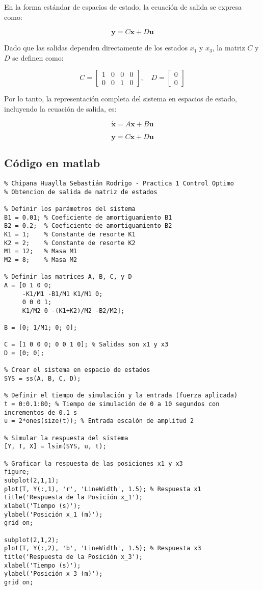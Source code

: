 \documentclass{report}
\begin{document}
En la forma estándar de espacios de estado, la ecuación de salida se expresa como:

\[
\mathbf{y} = C\mathbf{x} + D\mathbf{u}
\]

Dado que las salidas dependen directamente de los estados \(x_1\) y \(x_3\), la matriz \(C\) y \(D\) se definen como:

\[
C = \begin{bmatrix} 1 & 0 & 0 & 0 \\ 0 & 0 & 1 & 0 \end{bmatrix}, \quad D = \begin{bmatrix} 0 \\ 0 \end{bmatrix}
\]


Por lo tanto, la representación completa del sistema en espacios de estado, incluyendo la ecuación de salida, es:

\[
\dot{\mathbf{x}} = A\mathbf{x} + B\mathbf{u}
\]

\[
\mathbf{y} = C\mathbf{x} + D\mathbf{u}
\]

\subsection{Código en matlab}
\begin{verbatim}
% Chipana Huaylla Sebastián Rodrigo - Practica 1 Control Optimo
% Obtencion de salida de matriz de estados

% Definir los parámetros del sistema
B1 = 0.01; % Coeficiente de amortiguamiento B1
B2 = 0.2;  % Coeficiente de amortiguamiento B2
K1 = 1;    % Constante de resorte K1
K2 = 2;    % Constante de resorte K2
M1 = 12;   % Masa M1
M2 = 8;    % Masa M2

% Definir las matrices A, B, C, y D
A = [0 1 0 0;
     -K1/M1 -B1/M1 K1/M1 0;
     0 0 0 1;
     K1/M2 0 -(K1+K2)/M2 -B2/M2];

B = [0; 1/M1; 0; 0];

C = [1 0 0 0; 0 0 1 0]; % Salidas son x1 y x3
D = [0; 0];

% Crear el sistema en espacio de estados
SYS = ss(A, B, C, D);

% Definir el tiempo de simulación y la entrada (fuerza aplicada)
t = 0:0.1:80; % Tiempo de simulación de 0 a 10 segundos con incrementos de 0.1 s
u = 2*ones(size(t)); % Entrada escalón de amplitud 2

% Simular la respuesta del sistema
[Y, T, X] = lsim(SYS, u, t);

% Graficar la respuesta de las posiciones x1 y x3
figure;
subplot(2,1,1);
plot(T, Y(:,1), 'r', 'LineWidth', 1.5); % Respuesta x1
title('Respuesta de la Posición x_1');
xlabel('Tiempo (s)');
ylabel('Posición x_1 (m)');
grid on;

subplot(2,1,2);
plot(T, Y(:,2), 'b', 'LineWidth', 1.5); % Respuesta x3
title('Respuesta de la Posición x_3');
xlabel('Tiempo (s)');
ylabel('Posición x_3 (m)');
grid on;

\end{verbatim}
\end{document}
